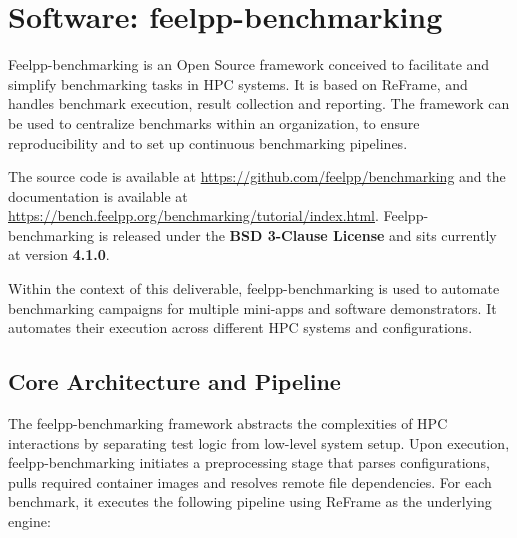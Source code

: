 \section{Software: feelpp-benchmarking}
\label{sec:WP7:Feel++:software:feelpp-benchmarking}


Feelpp-benchmarking is an Open Source framework conceived to facilitate and simplify benchmarking tasks in HPC systems.
It is based on ReFrame, and handles benchmark execution, result collection and reporting.
The framework can be used to centralize benchmarks within an organization, to ensure reproducibility and to set up continuous benchmarking pipelines.

The source code is available at \url{https://github.com/feelpp/benchmarking} and the documentation is available at \url{https://bench.feelpp.org/benchmarking/tutorial/index.html}.
Feelpp-benchmarking is released under the \textbf{BSD 3-Clause License} and sits currently at version \textbf{4.1.0}.

Within the context of this deliverable, feelpp-benchmarking is used to automate benchmarking campaigns for multiple mini-apps and software demonstrators. It automates their execution across different HPC systems and configurations.

\subsection{Core Architecture and Pipeline}

The feelpp-benchmarking framework abstracts the complexities of HPC interactions by separating test logic from low-level system setup.
Upon execution, feelpp-benchmarking initiates a preprocessing stage that parses configurations, pulls required container images and resolves remote file dependencies.
For each benchmark, it executes the following pipeline using ReFrame as the underlying engine:

